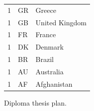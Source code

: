 \documentclass[
  printed, %
  table,   %
  nolof,     %
  nolot,     %
           oneside, color
]{fithesis3}
\begin{document}
\begin{figure}[H]
\begin{tabular}{lll}
1                            & GR                         & Greece                \\
1                            & GB                         & United Kingdom        \\
1                            & FR                         & France                \\
1                            & DK                         & Denmark               \\
1                            & BR                         & Brazil                \\
1                            & AU                         & Australia             \\
1                            & AF                         & Afghanistan           \\
\end{tabular}
\caption{Diploma thesis plan.}
\label{table:countriesminers}
\end{figure}
\end{document}

